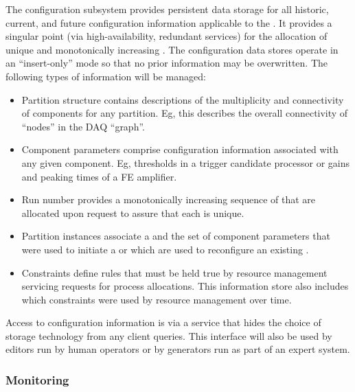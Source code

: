 The  configuration subsystem provides persistent data storage for all
historic, current, and future configuration information applicable to the
.
It provides a singular point (via high-availability, redundant services) for the
allocation of unique and monotonically increasing .
The configuration data stores operate in an ``insert-only'' mode so that no
prior information may be overwritten. 
The following types of information will be managed:

\begin{itemize}

\item Partition structure contains descriptions of the multiplicity and
  connectivity of  components for any partition. 
  Eg, this describes the overall connectivity of ``nodes'' in the DAQ ``graph''.

\item Component parameters comprise configuration information associated with
  any given  component. 
  Eg, thresholds in a trigger candidate processor or gains and peaking times of
  a FE amplifier.

\item Run number provides a monotonically increasing sequence of
   that are allocated upon request to assure that each is
  unique.

\item Partition instances associate a  and the set of component
  parameters that were used to initiate a  or which are used to
  reconfigure an existing .  

\item Constraints define rules that must be held true by resource management
  servicing requests for process allocations. 
  This information store also includes which constraints were used by resource
  management over time.
\end{itemize}


Access to configuration information is via a service that hides the choice of
storage technology from any client queries.
This interface will also be used by editors run by human operators or by
generators run as part of an expert system.

\subsubsection{Monitoring}
\label{sec:daq:design:ccm:monitoring}

